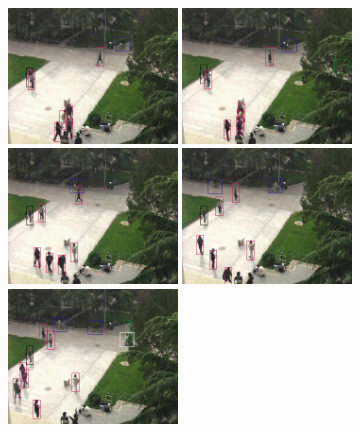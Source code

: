 \begin{figure}
\centering
\includegraphics[width=0.4\textwidth,bb=0 0 720 576]{016.jpg}
\includegraphics[width=0.4\textwidth,bb=0 0 720 576]{026.jpg}\\
\includegraphics[width=0.4\textwidth,bb=0 0 720 576]{071.jpg}
\includegraphics[width=0.4\textwidth,bb=0 0 720 576]{116.jpg}\\
\includegraphics[width=0.4\textwidth,bb=0 0 720 576]{166.jpg}

\end{figure}
